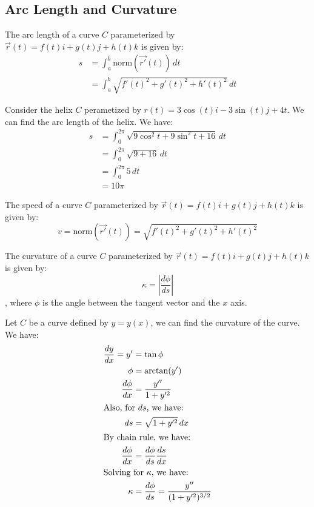 \documentclass[11pt]{report}
\begin{document}
\subsection{Arc Length and Curvature}
\begin{definition}
    The arc length of a curve $C$ parameterized by $\vec{r}(t) = f(t)i + g(t)j + h(t)k$ is given by:
    \begin{align}
        s &= \int_a^b \text{norm}(\vec{r'}(t)) \, dt \\
        &= \int_a^b \sqrt{f'(t)^2 + g'(t)^2 + h'(t)^2} \, dt
    \end{align}
\end{definition}
\begin{example}[Helix]
    Consider the helix $C$ perametized by $r(t) = 3\cos(t)i - 3\sin(t)j + 4t$. We can find the arc length of the helix. We have:
    \begin{align*}
        s &= \int_0^{2\pi} \sqrt{9\cos ^2 t + 9\sin ^2 t + 16} \, dt \\
        &= \int_0^{2\pi} \sqrt{9 + 16} \, dt \\
        &= \int_0^{2\pi} 5 \, dt \\
        &= 10\pi
    \end{align*}
\end{example}
\begin{definition}[Speed]
    The speed of a curve $C$ parameterized by $\vec{r}(t) = f(t)i + g(t)j + h(t)k$ is given by:
    \begin{equation}
        v = \text{norm}(\vec{r'}(t)) = \sqrt{f'(t)^2 + g'(t)^2 + h'(t)^2}
    \end{equation}
\end{definition}
\begin{definition}[Curvature]
    The curvature of a curve $C$ parameterized by $\vec{r}(t) = f(t)i + g(t)j + h(t)k$ is given by:
    \begin{equation}
        \kappa = \left| \frac{d\phi}{ds} \right|
    \end{equation}
    , where $\phi$ is the angle between the tangent vector and the $x$ axis.
\end{definition}
\begin{example}
    Let $C$ be a curve defined by $y = y(x)$, we can find the curvature of the curve. We have:
    \begin{align*}
        \frac{dy}{dx} = y' &= \tan \phi \\
        \phi &= \arctan(y') \\
        \frac{d\phi}{dx} &= \frac{y''}{1 + y'^2} \\
        \intertext{Also, for $ds$, we have:}
        ds &= \sqrt{1 + y'^2} \, dx \\
        \intertext{By chain rule, we have:}
        \frac{d\phi}{dx} &= \frac{d\phi}{ds} \frac{ds}{dx} \\
        \intertext{Solving for $\kappa$, we have:}
        \kappa &= \frac{d\phi}{ds} = \frac{y''}{(1 + y'^2)^{3/2}}
    \end{align*}
\end{example}
\end{document}
